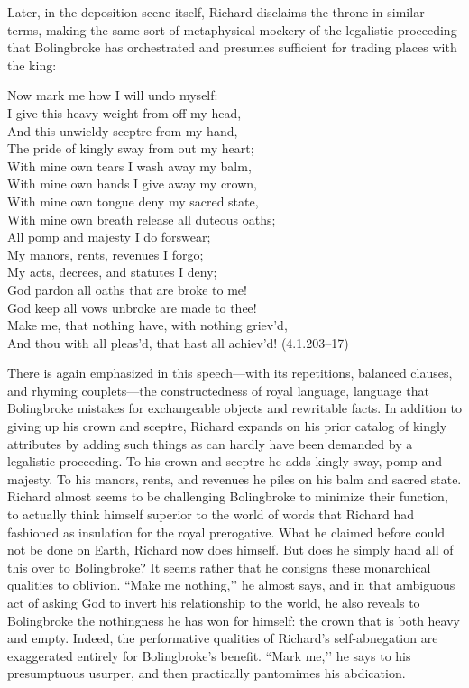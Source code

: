 Later, in the deposition scene itself, Richard disclaims the throne in similar terms, making the same sort of metaphysical mockery of the legalistic proceeding that Bolingbroke has orchestrated and presumes sufficient for trading places with the king:
\begin{vq}
Now mark me how I will undo myself: \\
I give this heavy weight from off my head, \\
And this unwieldy sceptre from my hand, \\
The pride of kingly sway from out my heart; \\
With mine own tears I wash away my balm, \\
With mine own hands I give away my crown, \\
With mine own tongue deny my sacred state, \\
With mine own breath release all duteous oaths; \\
All pomp and majesty I do forswear; \\
My manors, rents, revenues I forgo; \\
My acts, decrees, and statutes I deny; \\
God pardon all oaths that are broke to me! \\
God keep all vows unbroke are made to thee! \\
Make me, that nothing have, with nothing griev’d, \\
And thou with all pleas’d, that hast all achiev’d! (4.1.203--17)
\end{vq}
There is again emphasized in this speech---with its repetitions, balanced clauses, and rhyming couplets---the constructedness of royal language, language that Bolingbroke mistakes for exchangeable objects and rewritable facts.
In addition to giving up his crown and sceptre, Richard expands on his prior catalog of kingly attributes by adding such things as can hardly have been demanded by a legalistic proceeding.
To his crown and sceptre he adds kingly sway, pomp and majesty.
To his manors, rents, and revenues he piles on his balm and sacred state.
Richard almost seems to be challenging Bolingbroke to minimize their function, to actually think himself superior to the world of words that Richard had fashioned as insulation for the royal prerogative.
What he claimed before could not be done on Earth, Richard now does himself.
But does he simply hand all of this over to Bolingbroke? It seems rather that he consigns these monarchical qualities to oblivion.
``Make me nothing,’’ he almost says, and in that ambiguous act of asking God to invert his relationship to the world, he also reveals to Bolingbroke the nothingness he has won for himself: the crown that is both heavy and empty.
Indeed, the performative qualities of Richard’s self-abnegation are exaggerated entirely for Bolingbroke’s benefit.
``Mark me,’’ he says to his presumptuous usurper, and then practically pantomimes his abdication.

